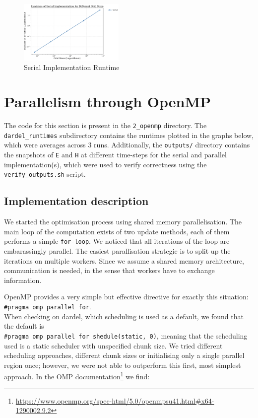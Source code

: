 \documentclass[a4paper,10pt]{article}
\begin{document}
\begin{multicols}{2}
\begin{figure}[H]
  \centering
  \includegraphics[width=0.45\textwidth]{../images/1_serial/serial_runtime.png}
  \caption{Serial Implementation Runtime}
  \label{fig:1_serial_runtime}
\end{figure}

\section{Parallelism through OpenMP}
\label{sec:omp}

The code for this section is present in the \verb|2_openmp| directory.
The \verb|dardel_runtimes| subdirectory contains the runtimes plotted in the graphs below, which were averages across 3 runs.
Additionally, the \verb|outputs/| directory contains the snapshots of \verb|E| and \verb|H| at different time-steps for the serial and parallel implementation(s), which were used to verify correctness using the \verb|verify_outputs.sh| script.

\subsection{Implementation description}
\label{sec:omp:implementation}
We started the optimisation process using shared memory parallelisation.
The main loop of the computation exists of two update methods, each of them performs a simple \verb|for-loop|.
We noticed that all iterations of the loop are embarassingly parallel.
The easiest parallisation strategie is to split up the iterations on multiple workers.
Since we assume a shared memory architecture, communication is needed, in the sense that workers have to exchange information.

OpenMP provides a very simple but effective directive for exactly this situation: \verb|#pragma omp parallel for|.\\
When checking on dardel, which scheduling is used as a default, we found that the default is\\
\verb|#pragma omp parallel for shedule(static, 0)|, meaning that the scheduling used is a static scheduler with unspecified chunk size.
We tried different scheduling approaches, different chunk sizes or initialising only a single parallel region once; however, we were not able to outperform this first, most simplest approach.
In the OMP documentation\footnote{\url{https://www.openmp.org/spec-html/5.0/openmpsu41.html\#x64-1290002.9.2}} we find:


\end{multicols}
\end{document}
